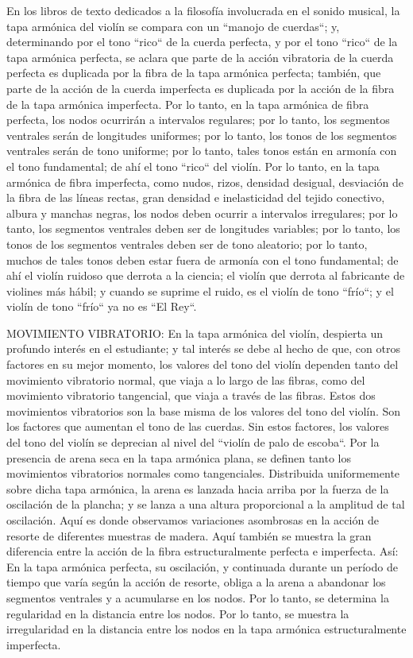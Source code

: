 \documentclass[12pt]{book}
\begin{document}
En los libros de texto dedicados a la filosofía involucrada en el sonido musical, la tapa armónica del violín se compara con un ``manojo de cuerdas``; y, determinando por el tono ``rico`` de la cuerda perfecta, y por el tono ``rico`` de la tapa armónica perfecta, se aclara que parte de la acción vibratoria de la cuerda perfecta es duplicada por la fibra de la tapa armónica perfecta; también, que parte de la acción de la cuerda imperfecta es duplicada por la acción de la fibra de la tapa armónica imperfecta. Por lo tanto, en la tapa armónica de fibra perfecta, los nodos ocurrirán a intervalos regulares; por lo tanto, los segmentos ventrales serán de longitudes uniformes; por lo tanto, los tonos de los segmentos ventrales serán de tono uniforme; por lo tanto, tales tonos están en armonía con el tono fundamental; de ahí el tono ``rico`` del violín. Por lo tanto, en la tapa armónica de fibra imperfecta, como nudos, rizos, densidad desigual, desviación de la fibra de las líneas rectas, gran densidad e inelasticidad del tejido conectivo, albura y manchas negras, los nodos deben ocurrir a intervalos irregulares; por lo tanto, los segmentos ventrales deben ser de longitudes variables; por lo tanto, los tonos de los segmentos ventrales deben ser de tono aleatorio; por lo tanto, muchos de tales tonos deben estar fuera de armonía con el tono fundamental; de ahí el violín ruidoso que derrota a la ciencia; el violín que derrota al fabricante de violines más hábil; y cuando se suprime el ruido, es el violín de tono ``frío``; y el violín de tono ``frío`` ya no es ``El Rey``.

MOVIMIENTO VIBRATORIO: En la tapa armónica del violín, despierta un profundo interés en el estudiante; y tal interés se debe al hecho de que, con otros factores en su mejor momento, los valores del tono del violín dependen tanto del movimiento vibratorio normal, que viaja a lo largo de las fibras, como del movimiento vibratorio tangencial, que viaja a través de las fibras. Estos dos movimientos vibratorios son la base misma de los valores del tono del violín. Son los factores que aumentan el tono de las cuerdas. Sin estos factores, los valores del tono del violín se deprecian al nivel del ``violín de palo de escoba``. Por la presencia de arena seca en la tapa armónica plana, se definen tanto los movimientos vibratorios normales como tangenciales. Distribuida uniformemente sobre dicha tapa armónica, la arena es lanzada hacia arriba por la fuerza de la oscilación de la plancha; y se lanza a una altura proporcional a la amplitud de tal oscilación. Aquí es donde observamos variaciones asombrosas en la acción de resorte de diferentes muestras de madera. Aquí también se muestra la gran diferencia entre la acción de la fibra estructuralmente perfecta e imperfecta. Así: En la tapa armónica perfecta, su oscilación, y continuada durante un período de tiempo que varía según la acción de resorte, obliga a la arena a abandonar los segmentos ventrales y a acumularse en los nodos. Por lo tanto, se determina la regularidad en la distancia entre los nodos. Por lo tanto, se muestra la irregularidad en la distancia entre los nodos en la tapa armónica estructuralmente imperfecta.
\end{document}
